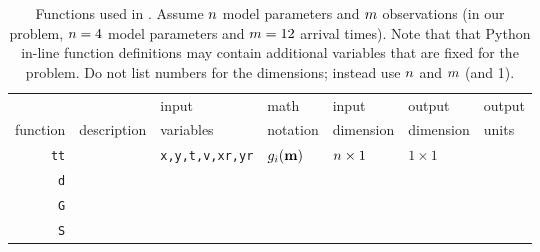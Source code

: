 \begin{table}[h]
\caption[]{{
Functions used in \tfile.
Assume $n$ model parameters and $m$ observations (in our problem, $n=4$ model parameters and $m=12$ arrival times).
Note that that Python in-line function definitions may contain additional variables that are fixed for the problem.
Do not list numbers for the dimensions; instead use $n$ and $m$ (and 1).
\label{tab:funs}
}}
\begin{spacing}{4}
\hspace{-1.2cm}
\begin{tabular}{r|l|l|l|l|l|l}
\hline
         &                          & input      & math      & input     & output    & output \\
function & description \hspace{3cm} & variables  & notation  & dimension & dimension & units \hspace{0.5cm} \\
\hline\hline 
\verb+tt+ & & {\tt x,y,t,v,xr,yr} & $g_i(\mbox{${\bf m}$})$ & $n \times 1$ & $1 \times 1$ & \\ \hline
\verb+d+  & & & & & & \\ \hline
\verb+G+  & & & & & & \\ \hline
\verb+S+  & & & & & & \\ \hline
\end{tabular}
\end{spacing}
\end{table}

